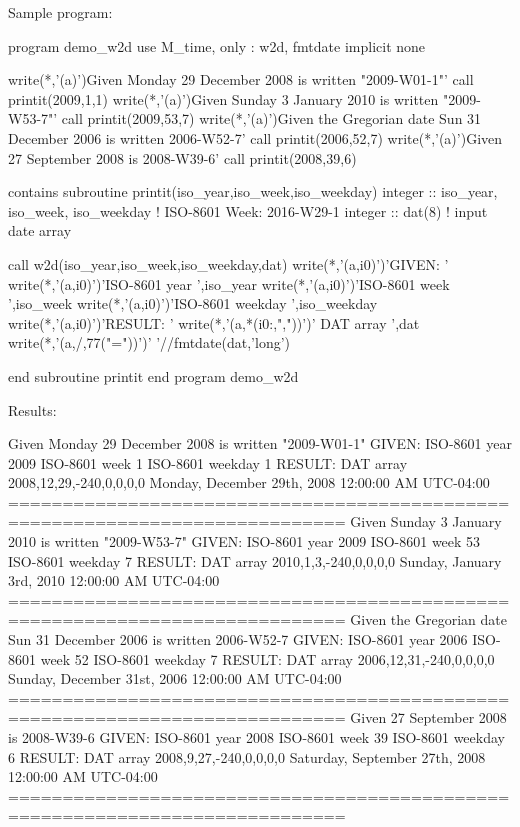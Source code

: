 \begin{DoxyVerb}
\begin{DoxyVerb}Sample program:

 program demo_w2d
 use M_time, only : w2d, fmtdate
 implicit none

    write(*,'(a)')Given Monday 29 December 2008 is written "2009-W01-1"'
    call printit(2009,1,1)
    write(*,'(a)')Given Sunday 3 January 2010 is written "2009-W53-7"'
    call printit(2009,53,7)
    write(*,'(a)')Given the Gregorian date Sun 31 December 2006 is written 2006-W52-7'
    call printit(2006,52,7)
    write(*,'(a)')Given 27 September 2008 is 2008-W39-6'
    call printit(2008,39,6)

 contains
 subroutine printit(iso_year,iso_week,iso_weekday)
 integer  :: iso_year, iso_week, iso_weekday ! ISO-8601 Week:   2016-W29-1
 integer  :: dat(8)                          ! input date array

    call w2d(iso_year,iso_week,iso_weekday,dat)
    write(*,'(a,i0)')'GIVEN:           '
    write(*,'(a,i0)')'ISO-8601 year    ',iso_year
    write(*,'(a,i0)')'ISO-8601 week    ',iso_week
    write(*,'(a,i0)')'ISO-8601 weekday ',iso_weekday
    write(*,'(a,i0)')'RESULT:          '
    write(*,'(a,*(i0:,","))')'   DAT array        ',dat
    write(*,'(a,/,77("="))')'    '//fmtdate(dat,'long')

 end subroutine printit
 end program demo_w2d

Results:

 Given Monday 29 December 2008 is written "2009-W01-1"
 GIVEN:
 ISO-8601 year    2009
 ISO-8601 week    1
 ISO-8601 weekday 1
 RESULT:
    DAT array        2008,12,29,-240,0,0,0,0
     Monday, December 29th, 2008 12:00:00 AM UTC-04:00
 =============================================================================
 Given Sunday 3 January 2010 is written "2009-W53-7"
 GIVEN:
 ISO-8601 year    2009
 ISO-8601 week    53
 ISO-8601 weekday 7
 RESULT:
    DAT array        2010,1,3,-240,0,0,0,0
     Sunday, January 3rd, 2010 12:00:00 AM UTC-04:00
 =============================================================================
 Given the Gregorian date Sun 31 December 2006 is written 2006-W52-7
 GIVEN:
 ISO-8601 year    2006
 ISO-8601 week    52
 ISO-8601 weekday 7
 RESULT:
    DAT array        2006,12,31,-240,0,0,0,0
     Sunday, December 31st, 2006 12:00:00 AM UTC-04:00
 =============================================================================
 Given 27 September 2008 is 2008-W39-6
 GIVEN:
 ISO-8601 year    2008
 ISO-8601 week    39
 ISO-8601 weekday 6
 RESULT:
    DAT array        2008,9,27,-240,0,0,0,0
     Saturday, September 27th, 2008 12:00:00 AM UTC-04:00
 =============================================================================
\end{DoxyVerb}



\end{DoxyVerb}
